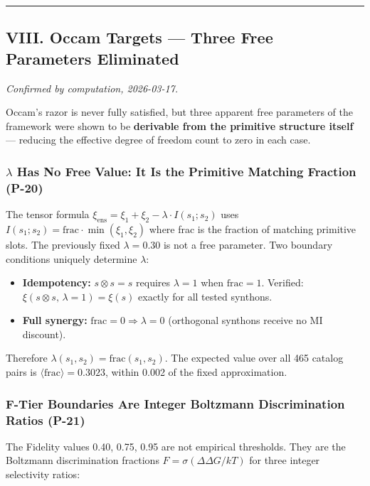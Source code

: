 \documentclass[12pt,a4paper]{article}
\begin{document}
\begin{center}
\rule{0.5\textwidth}{0.4pt}
\end{center}

\subsection{VIII. Occam Targets --- Three Free Parameters Eliminated}

\emph{Confirmed by computation, 2026-03-17.}

Occam's razor is never fully satisfied, but three apparent free parameters of the framework were shown to be \textbf{derivable from the primitive structure itself} --- reducing the effective degree of freedom count to zero in each case.

\subsubsection{$\lambda$ Has No Free Value: It Is the Primitive Matching Fraction (P-20)}

The tensor formula $\xi_\text{ens} = \xi_1 + \xi_2 - \lambda \cdot I(s_1; s_2)$ uses $I(s_1;s_2) = \text{frac} \cdot \min(\xi_1,\xi_2)$ where frac is the fraction of matching primitive slots. The previously fixed $\lambda = 0.30$ is not a free parameter. Two boundary conditions uniquely determine $\lambda$:

\begin{itemize}
    \item \textbf{Idempotency:} $s \otimes s = s$ requires $\lambda = 1$ when $\text{frac} = 1$. Verified: $\xi(s \otimes s,\, \lambda=1) = \xi(s)$ exactly for all tested synthons.
    \item \textbf{Full synergy:} $\text{frac} = 0 \Rightarrow \lambda = 0$ (orthogonal synthons receive no MI discount).
\end{itemize}

Therefore $\lambda(s_1,s_2) = \text{frac}(s_1,s_2)$. The expected value over all 465 catalog pairs is $\langle \text{frac} \rangle = 0.3023$, within 0.002 of the fixed approximation.

\subsubsection{F-Tier Boundaries Are Integer Boltzmann Discrimination Ratios (P-21)}

The Fidelity values 0.40, 0.75, 0.95 are not empirical thresholds. They are the Boltzmann discrimination fractions $F = \sigma(\Delta\Delta G / kT)$ for three integer selectivity ratios:
\end{document}
